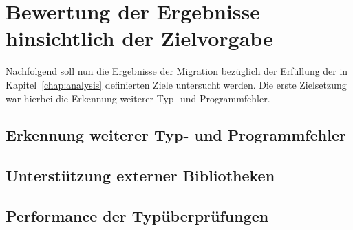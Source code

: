 

\section{Bewertung der Ergebnisse hinsichtlich der Zielvorgabe}

Nachfolgend soll nun die Ergebnisse der Migration bezüglich der Erfüllung der in Kapitel~\ref{chap:analysis} definierten Ziele untersucht werden. Die erste Zielsetzung war hierbei die Erkennung weiterer Typ- und Programmfehler.

\subsection{Erkennung weiterer Typ- und Programmfehler}
\label{goal:new-type-errors}




\subsection{Unterstützung externer Bibliotheken}


\subsection{Performance der Typüberprüfungen}


